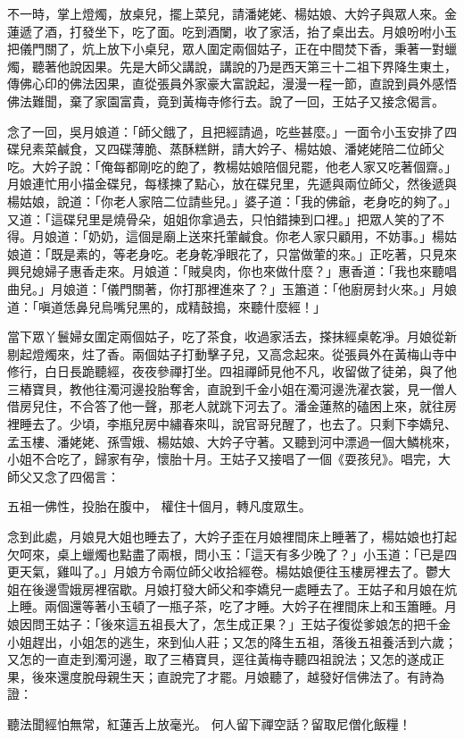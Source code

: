 不一時，掌上燈燭，放桌兒，擺上菜兒，請潘姥姥、楊姑娘、大妗子與眾人來。金蓮遞了酒，打發坐下，吃了面。吃到酒闌，收了家活，抬了桌出去。月娘吩咐小玉把儀門關了，炕上放下小桌兒，眾人圍定兩個姑子，正在中間焚下香，秉著一對蠟燭，聽著他說因果。先是大師父講說，講說的乃是西天第三十二祖下界降生東土，傳佛心印的佛法因果，直從張員外家豪大富說起，漫漫一程一節，直說到員外感悟佛法難聞，棄了家園富貴，竟到黃梅寺修行去。說了一回，王姑子又接念偈言。

念了一回，吳月娘道：「師父餓了，且把經請過，吃些甚麼。」一面令小玉安排了四碟兒素菜鹹食，又四碟薄脆、蒸酥糕餅，請大妗子、楊姑娘、潘姥姥陪二位師父吃。大妗子說：「俺每都剛吃的飽了，教楊姑娘陪個兒罷，他老人家又吃著個齋。」月娘連忙用小描金碟兒，每樣揀了點心，放在碟兒里，先遞與兩位師父，然後遞與楊姑娘，說道：「你老人家陪二位請些兒。」婆子道：「我的佛爺，老身吃的夠了。」又道：「這碟兒里是燒骨朵，姐姐你拿過去，只怕錯揀到口裡。」把眾人笑的了不得。月娘道：「奶奶，這個是廟上送來托葷鹹食。你老人家只顧用，不妨事。」楊姑娘道：「既是素的，等老身吃。老身乾凈眼花了，只當做葷的來。」正吃著，只見來興兒媳婦子惠香走來。月娘道：「賊臭肉，你也來做什麼？」惠香道：「我也來聽唱曲兒。」月娘道：「儀門關著，你打那裡進來了？」玉簫道：「他廚房封火來。」月娘道：「嗔道恁鼻兒烏嘴兒黑的，成精鼓搗，來聽什麼經！」

當下眾丫鬟婦女圍定兩個姑子，吃了茶食，收過家活去，搽抹經桌乾凈。月娘從新剔起燈燭來，炷了香。兩個姑子打動擊子兒，又高念起來。從張員外在黃梅山寺中修行，白日長跪聽經，夜夜參禪打坐。四祖禪師見他不凡，收留做了徒弟，與了他三樁寶貝，教他往濁河邊投胎奪舍，直說到千金小姐在濁河邊洗濯衣裳，見一僧人借房兒住，不合答了他一聲，那老人就跳下河去了。潘金蓮熬的磕困上來，就往房裡睡去了。少頃，李瓶兒房中繡春來叫，說官哥兒醒了，也去了。只剩下李嬌兒、孟玉樓、潘姥姥、孫雪娥、楊姑娘、大妗子守著。又聽到河中漂過一個大鱗桃來，小姐不合吃了，歸家有孕，懷胎十月。王姑子又接唱了一個《耍孩兒》。唱完，大師父又念了四偈言：

五祖一佛性，投胎在腹中，
權住十個月，轉凡度眾生。

念到此處，月娘見大姐也睡去了，大妗子歪在月娘裡間床上睡著了，楊姑娘也打起欠呵來，桌上蠟燭也點盡了兩根，問小玉：「這天有多少晚了？」小玉道：「已是四更天氣，雞叫了。」月娘方令兩位師父收拾經卷。楊姑娘便往玉樓房裡去了。鬱大姐在後邊雪娥房裡宿歇。月娘打發大師父和李嬌兒一處睡去了。王姑子和月娘在炕上睡。兩個還等著小玉頓了一瓶子茶，吃了才睡。大妗子在裡間床上和玉簫睡。月娘因問王姑子：「後來這五祖長大了，怎生成正果？」王姑子復從爹娘怎的把千金小姐趕出，小姐怎的逃生，來到仙人莊；又怎的降生五祖，落後五祖養活到六歲；又怎的一直走到濁河邊，取了三樁寶貝，逕往黃梅寺聽四祖說法；又怎的遂成正果，後來還度脫母親生天；直說完了才罷。月娘聽了，越發好信佛法了。有詩為證：

聽法聞經怕無常，紅蓮舌上放毫光。
何人留下禪空話？留取尼僧化飯糧！

